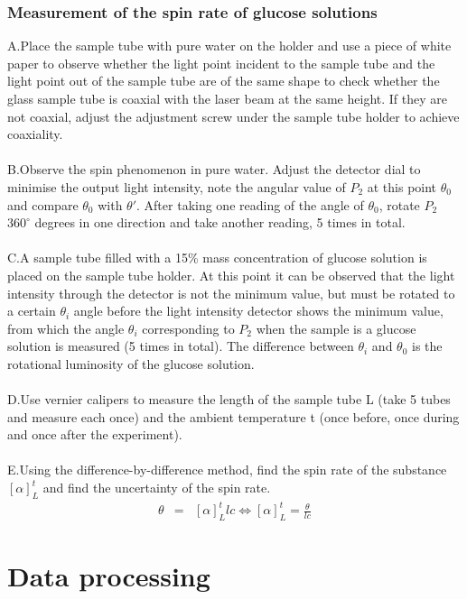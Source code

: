 \documentclass[UTF8]{article}
\begin{document}
	\subsubsection{Measurement of the spin rate of glucose solutions}
	A.Place the sample tube with pure water on the holder and use a piece of white paper to observe whether the light point incident to the sample tube and the light point out of the sample tube are of the same shape to check whether the glass sample tube is coaxial with the laser beam at the same height. If they are not coaxial, adjust the adjustment screw under the sample tube holder to achieve coaxiality.
	\\
	\\B.Observe the spin phenomenon in pure water. Adjust the detector dial to minimise the output light intensity, note the angular value of $P_{2} $ at this point $\theta _{0} $ and compare $\theta _{0} $ with ${\theta  }'   $. After taking one reading of the angle of $\theta _{0} $, rotate $P_{2} $ $360^\circ$ degrees in one direction and take another reading, 5 times in total.
	\\
	\\C.A sample tube filled with a 15\% mass concentration of glucose solution is placed on the sample tube holder. At this point it can be observed that the light intensity through the detector is not the minimum value, but must be rotated to a certain $\theta _{i} $ angle before the light intensity detector shows the minimum value, from which the angle $\theta _{i} $ corresponding to  $P_{2} $ when the sample is a glucose solution is measured (5 times in total). The difference between $\theta _{i} $ and $\theta _{0} $ is the rotational luminosity of the glucose solution.
	\\
	\\D.Use vernier calipers to measure the length of the sample tube L (take 5 tubes and measure each once) and the ambient temperature t (once before, once during and once after the experiment).
	\\
	\\E.Using the difference-by-difference method, find the spin rate of the substance $\left [ \alpha  \right ] _{L}^{t} $ and find the uncertainty of the spin rate.
	\begin{eqnarray} \theta & = & \left [ \alpha  \right ] _{L}^{t} lc \Longleftrightarrow \left [ \alpha  \right ] _{L}^{t}=\frac{\theta }{lc} \end{eqnarray}
	\section{Data processing}
\end{document}
